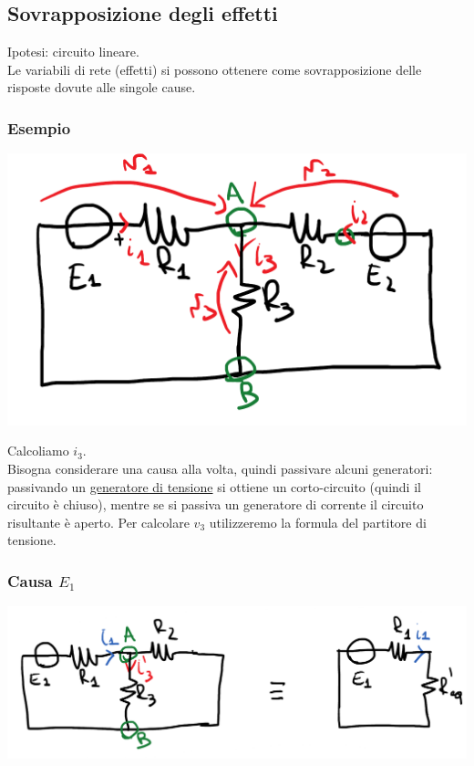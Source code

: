 \documentclass{article}
\begin{document}
\subsection{Sovrapposizione degli effetti}
Ipotesi: circuito lineare.\\
Le variabili di rete (effetti) si possono ottenere come sovrapposizione delle risposte dovute alle singole cause.

\subsubsection{Esempio}
\begin{center}
    \includegraphics[scale=0.2]{Image/Esempio_MetAnalisi_1.png}
\end{center}
Calcoliamo $i_3$.\\
Bisogna considerare una causa alla volta, quindi passivare alcuni generatori: passivando un \underline{generatore di tensione} si ottiene un corto-circuito (quindi il circuito è chiuso), mentre se si passiva un generatore di corrente il circuito risultante è aperto. Per calcolare $v_3$ utilizzeremo la formula del partitore di tensione.
\subsubsection*{Causa \texorpdfstring{$E_1$}{E1}}
\begin{center}
    \includegraphics[scale=0.3]{Image/Esempio_MetAnal_2.png}
\end{center}
\end{document}
